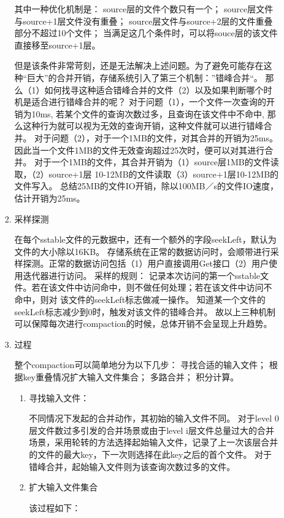 \begin{enumerate}
\begin{enumerate}
\begin{enumerate}
				其中一种优化机制是：
				source层的文件个数只有一个；
				source层文件与source+1层文件没有重叠；
				source层文件与source+2层的文件重叠部分不超过10个文件；
				当满足这几个条件时，可以将souce层的该文件直接移至source+1层。
				
				但是该条件非常苛刻，还是无法解决上述问题。为了避免可能存在这种“巨大”的合并开销，存储系统引入了第三个机制：”错峰合并“。
				那么（1）如何找寻这种适合错峰合并的文件（2）以及如果判断哪个时机是适合进行错峰合并的呢？
				对于问题（1），一个文件一次查询的开销为10ms, 若某个文件的查询次数过多，且查询在该文件中不命中, 那么这种行为就可以视为无效的查询开销，这种文件就可以进行错峰合并。
				对于问题（2），对于一个1MB的文件，对其合并的开销为25ms。因此当一个文件1MB的文件无效查询超过25次时，便可以对其进行合并。
				对于一个1MB的文件，其合并开销为（1）source层1MB的文件读取，（2）source+1层 10-12MB的文件读取（3）source+1层10-12MB的文件写入。
				总结25MB的文件IO开销，除以100MB／s的文件IO速度，估计开销为25ms。
				
				\item 采样探测
				
				在每个sstable文件的元数据中，还有一个额外的字段seekLeft，默认为文件的大小除以16KB。
				存储系统在正常的数据访问时，会顺带进行采样探测。正常的数据访问包括（1）用户直接调用Get接口（2）用户使用迭代器进行访问。
				采样的规则：
				记录本次访问的第一个sstable文件。若在该文件中访问命中，则不做任何处理；若在该文件中访问不命中，则对 该文件的seekLeft标志做减一操作。
				知道某一个文件的seekLeft标志减少到0时，触发对该文件的错峰合并。
				故以上三种机制可以保障每次进行compaction的时候，总体开销不会呈现上升趋势。
				
				\item 过程
				
				整个compaction可以简单地分为以下几步：
				寻找合适的输入文件；
				根据key重叠情况扩大输入文件集合；
				多路合并；
				积分计算。
				
				\begin{enumerate}
					\item 寻找输入文件：
				
					不同情况下发起的合并动作，其初始的输入文件不同。
					对于level 0层文件数过多引发的合并场景或由于level i层文件总量过大的合并场景，采用轮转的方法选择起始输入文件，记录了上一次该层合并的文件的最大key，下一次则选择在此key之后的首个文件。
					对于错峰合并，起始输入文件则为该查询次数过多的文件。
					
					\item 扩大输入文件集合
					
					该过程如下：
					

\end{enumerate}
\end{enumerate}
\end{enumerate}
\end{enumerate}
